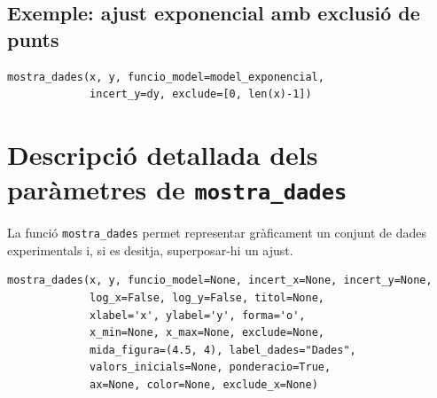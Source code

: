 \documentclass[11pt,a4paper]{article}
\begin{document}
\subsection*{Exemple: ajust exponencial amb exclusió de punts}
\begin{lstlisting}
mostra_dades(x, y, funcio_model=model_exponencial, 
             incert_y=dy, exclude=[0, len(x)-1])
\end{lstlisting}

\section{Descripció detallada dels paràmetres de \texttt{mostra\_dades}}

La funció \texttt{mostra\_dades} permet representar gràficament un conjunt de dades experimentals i, si es desitja, superposar-hi un ajust.

\begin{lstlisting}
mostra_dades(x, y, funcio_model=None, incert_x=None, incert_y=None,
             log_x=False, log_y=False, titol=None,
             xlabel='x', ylabel='y', forma='o',
             x_min=None, x_max=None, exclude=None,
             mida_figura=(4.5, 4), label_dades="Dades",
             valors_inicials=None, ponderacio=True,
             ax=None, color=None, exclude_x=None)
\end{lstlisting}
\end{document}
